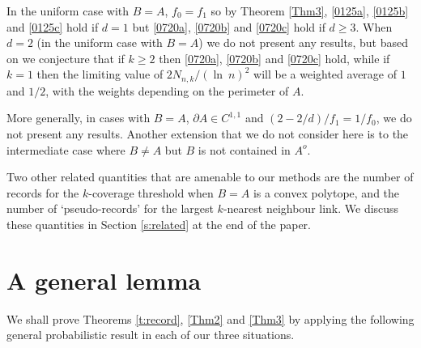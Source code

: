 \documentclass[12pt]{article}
\renewcommand{\log}{{\ln \:}}
\begin{document}
In the uniform case with $B=A$, $f_0= f_1$ so by Theorem \ref{Thm3},
\eqref{0125a}, \eqref{0125b} 
	and \eqref{0125c} hold if $d =1$
	 but
	\eqref{0720a}, \eqref{0720b} and \eqref{0720c}
	  hold if $d \geq 3$. When
	$d=2$ (in the uniform case with $B=A$) we do not present any results,
	but based on \cite[Theorem 3.2]{MPCov} we
	conjecture that if $k \geq 2$ then
	\eqref{0720a}, \eqref{0720b} and \eqref{0720c}
	hold, while if $k=1$ then the limiting value 
	of $2 N_{n,k}/(\log n)^2$ will be a weighted average of
	$1$ and $1/2$, with the weights depending on
	the perimeter of $A$.

	More generally, in cases with $B=A$, $\partial A \in C^{1,1}$
	and $(2-2/d)/f_1 = 1/f_0$, we do not present any results.
	Another extension that we do not consider here is to the intermediate
	case where $B \neq A$ but $B$ is not contained in $A^o$.

	Two other related quantities  that are amenable to our
	methods are the number of records for the $k$-coverage 
	threshold when $B=A$ is a convex polytope, and the number of
	`pseudo-records' for the largest $k$-nearest neighbour link. We
	discuss these quantities in Section \ref{s:related}
	at the end of the paper.

	\section{A general lemma}
	We shall prove Theorems \ref{t:record}, \ref{Thm2} and \ref{Thm3}
	by applying the following general probabilistic result
	in each of our three situations.
\end{document}
